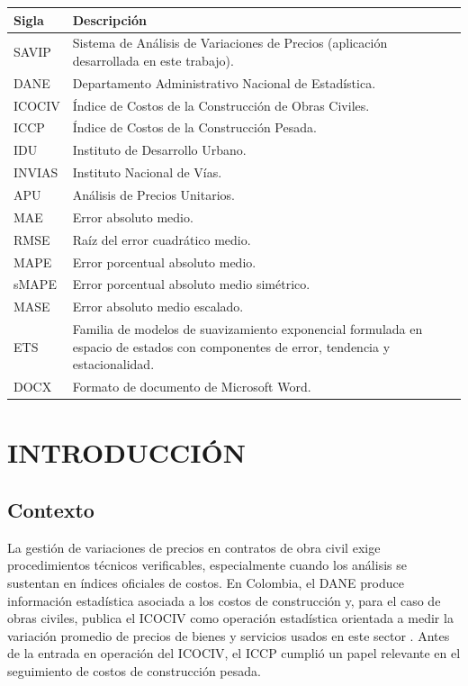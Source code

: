 \documentclass[12pt,letterpaper]{article}
\providecommand{\parencite}{\citep}
\newcommand{\ICOCIV}{ICOCIV}
\newcommand{\ICCP}{ICCP}
\newcommand{\DANE}{DANE}
\begin{document}
\noindent\begin{tabularx}{\textwidth}{@{}lY@{}}
\toprule
\textbf{Sigla} & \textbf{Descripción} \\
\midrule
SAVIP & Sistema de Análisis de Variaciones de Precios (aplicación desarrollada en este trabajo). \\
DANE & Departamento Administrativo Nacional de Estadística. \\
ICOCIV & Índice de Costos de la Construcción de Obras Civiles. \\
ICCP & Índice de Costos de la Construcción Pesada. \\
IDU & Instituto de Desarrollo Urbano. \\
INVIAS & Instituto Nacional de Vías. \\
APU & Análisis de Precios Unitarios. \\
MAE & Error absoluto medio. \\
RMSE & Raíz del error cuadrático medio. \\
MAPE & Error porcentual absoluto medio. \\
sMAPE & Error porcentual absoluto medio simétrico. \\
MASE & Error absoluto medio escalado. \\
ETS & Familia de modelos de suavizamiento exponencial formulada en espacio de estados con componentes de error, tendencia y estacionalidad. \\
DOCX & Formato de documento de Microsoft Word. \\
\bottomrule
\end{tabularx}

\newpage
{}

\section{INTRODUCCIÓN}

\subsection{Contexto}

La gestión de variaciones de precios en contratos de obra civil exige procedimientos técnicos verificables, especialmente cuando los análisis se sustentan en índices oficiales de costos. En Colombia, el \DANE{} produce información estadística asociada a los costos de construcción y, para el caso de obras civiles, publica el \ICOCIV{} como operación estadística orientada a medir la variación promedio de precios de bienes y servicios usados en este sector \parencite{dane_ficha_icociv,dane_metodologia_icociv}. Antes de la entrada en operación del \ICOCIV, el \ICCP{} cumplió un papel relevante en el seguimiento de costos de construcción pesada.
\end{document}

